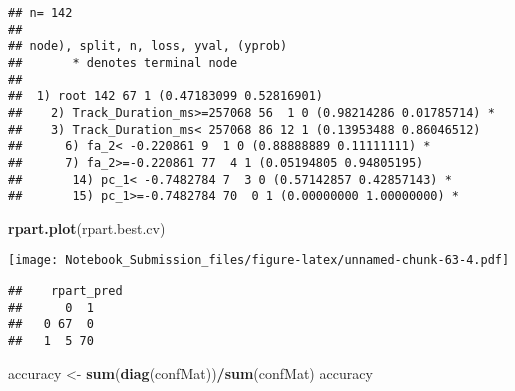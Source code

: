 \documentclass[
]{article}
\newenvironment{Shaded}{\begin{snugshade}}{\end{snugshade}}
\newcommand{\CommentTok}[1]{\textcolor[rgb]{0.56,0.35,0.01}{\textit{#1}}}
\newcommand{\DataTypeTok}[1]{\textcolor[rgb]{0.13,0.29,0.53}{#1}}
\newcommand{\DecValTok}[1]{\textcolor[rgb]{0.00,0.00,0.81}{#1}}
\newcommand{\KeywordTok}[1]{\textcolor[rgb]{0.13,0.29,0.53}{\textbf{#1}}}
\newcommand{\NormalTok}[1]{#1}
\newcommand{\OperatorTok}[1]{\textcolor[rgb]{0.81,0.36,0.00}{\textbf{#1}}}
\newcommand{\StringTok}[1]{\textcolor[rgb]{0.31,0.60,0.02}{#1}}
\begin{document}
\begin{Shaded}
\end{Shaded}

\begin{verbatim}
## n= 142 
## 
## node), split, n, loss, yval, (yprob)
##       * denotes terminal node
## 
##  1) root 142 67 1 (0.47183099 0.52816901)  
##    2) Track_Duration_ms>=257068 56  1 0 (0.98214286 0.01785714) *
##    3) Track_Duration_ms< 257068 86 12 1 (0.13953488 0.86046512)  
##      6) fa_2< -0.220861 9  1 0 (0.88888889 0.11111111) *
##      7) fa_2>=-0.220861 77  4 1 (0.05194805 0.94805195)  
##       14) pc_1< -0.7482784 7  3 0 (0.57142857 0.42857143) *
##       15) pc_1>=-0.7482784 70  0 1 (0.00000000 1.00000000) *
\end{verbatim}

\begin{Shaded}
\begin{Highlighting}[]
\KeywordTok{rpart.plot}\NormalTok{(rpart.best.cv)}
\end{Highlighting}
\end{Shaded}

\texttt{[image: Notebook\_Submission\_files/figure-latex/unnamed-chunk-63-4.pdf]}

\begin{Shaded}
\end{Shaded}

\begin{verbatim}
##    rpart_pred
##      0  1
##   0 67  0
##   1  5 70
\end{verbatim}

\begin{Shaded}
\begin{Highlighting}[]
\NormalTok{accuracy <-}\StringTok{ }\KeywordTok{sum}\NormalTok{(}\KeywordTok{diag}\NormalTok{(confMat))}\OperatorTok{/}\KeywordTok{sum}\NormalTok{(confMat)}
\NormalTok{accuracy}
\end{Highlighting}
\end{Shaded}
\end{document}
